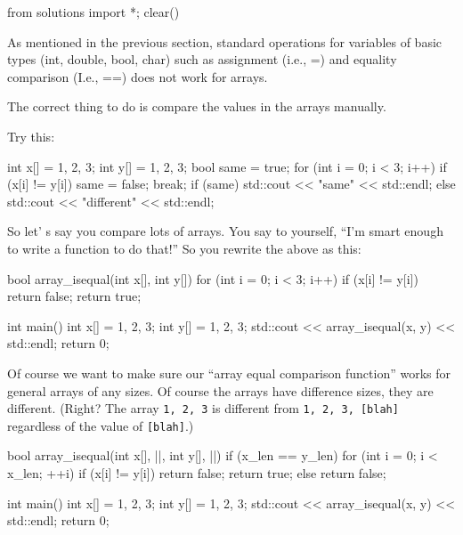 \begin{python0}
from solutions import *; clear()
\end{python0}

As mentioned in the previous section, standard operations for variables of basic types (int, double, bool, char) such as assignment (i.e., =) and equality comparison (I.e., ==) does not work for arrays.

The correct thing to do is compare the values in the arrays manually.

Try this:

\begin{consolethree}[escapeinside=||]
int x[] = {1, 2, 3};
int y[] = {1, 2, 3};
bool same = true;
for (int i = 0; i < 3; i++)
{
    if (x[i] != y[i])
    {
        same = false;
        break;
    }
}
if (same)
{
    std::cout << "same" << std::endl;
}
else
{
    std::cout << "different" << std::endl;
}
\end{consolethree}

So let' s say you compare lots of arrays. You say to yourself, ``I'm smart enough to write a function to do that!'' So you rewrite the above as this:

\begin{consolethree}[escapeinside=||]
bool array_isequal(int x[], int y[])
{
    for (int i = 0; i < 3; i++)
    {
        if (x[i] != y[i])
        {
            return false;
        }
    }
    return true;
}

int main()
{
    int x[] = {1, 2, 3};
    int y[] = {1, 2, 3};
    std::cout << array_isequal(x, y) << std::endl;
    return 0;
}
\end{consolethree}

Of course we want to make sure our ``array equal comparison function'' works for general arrays of any sizes. Of course the arrays have difference sizes, they are different. (Right? The array \texttt{{1, 2, 3}} is different from \texttt{{1, 2, 3, [blah]}} regardless of the value of \texttt{[blah]}.)

\begin{consolethree}[escapeinside=||]
bool array_isequal(int x[], ||,
                    int y[], ||)
{
    if (x_len == y_len)
    {
        for (int i = 0; i < x_len; ++i)
        {
            if (x[i] != y[i])
            {
                return false;
            }
        }
        return true;
    }
    else
    {
        return false;
    }
}

int main()
{
    int x[] = {1, 2, 3};
    int y[] = {1, 2, 3};
    std::cout << array_isequal(x, y) << std::endl;
    return 0;
}
\end{consolethree}

